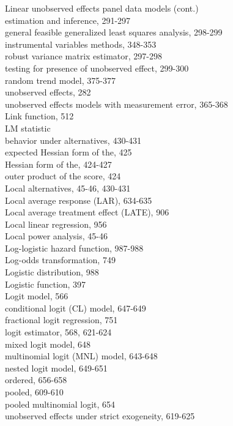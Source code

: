 \documentclass[10pt]{article}
\begin{document}
Linear unobserved effects panel data models (cont.)\\
estimation and inference, 291-297\\
general feasible generalized least squares analysis, 298-299\\
instrumental variables methods, 348-353\\
robust variance matrix estimator, 297-298\\
testing for presence of unobserved effect, 299-300\\
random trend model, 375-377\\
unobserved effects, 282\\
unobserved effects models with measurement error, 365-368\\
Link function, 512\\
LM statistic\\
behavior under alternatives, 430-431\\
expected Hessian form of the, 425\\
Hessian form of the, 424-427\\
outer product of the score, 424\\
Local alternatives, 45-46, 430-431\\
Local average response (LAR), 634-635\\
Local average treatment effect (LATE), 906\\
Local linear regression, 956\\
Local power analysis, 45-46\\
Log-logistic hazard function, 987-988\\
Log-odds transformation, 749\\
Logistic distribution, 988\\
Logistic function, 397\\
Logit model, 566\\
conditional logit (CL) model, 647-649\\
fractional logit regression, 751\\
logit estimator, 568, 621-624\\
mixed logit model, 648\\
multinomial logit (MNL) model, 643-648\\
nested logit model, 649-651\\
ordered, 656-658\\
pooled, 609-610\\
pooled multinomial logit, 654\\
unobserved effects under strict exogeneity, 619-625\\
\end{document}
